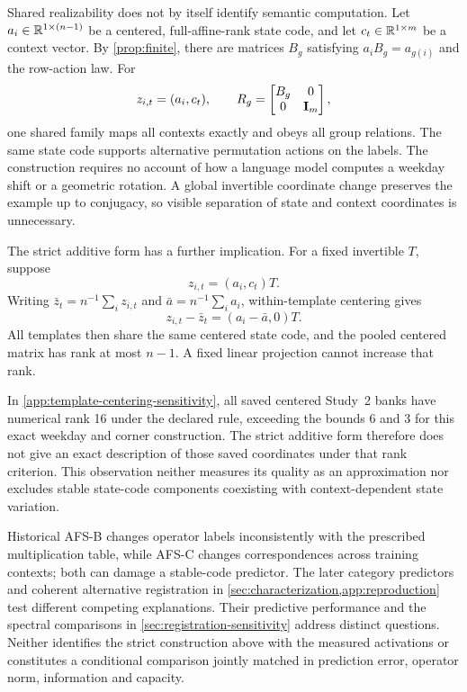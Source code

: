 Shared realizability does not by itself identify semantic
computation.
Let $a_i\in\mathbb{R}^{1\times(n-1)}$ be a centered,
full-affine-rank state code, and let
$c_t\in\mathbb{R}^{1\times m}$ be a context vector.
By \cref{prop:finite}, there are matrices $B_g$ satisfying
$a_iB_g=a_{g(i)}$ and the row-action law.
For
\[
 z_{i,t}=(a_i,c_t),
 \qquad
 R_g=
 \begin{bmatrix}
  B_g&0\\
  0&\mathbf{I}_m
 \end{bmatrix},
\]
one shared family maps all contexts exactly and obeys all
group relations.
The same state code supports alternative permutation
actions on the labels.
The construction requires no account of how a language
model computes a weekday shift or a geometric rotation.
A global invertible coordinate change preserves the
example up to conjugacy, so visible separation of state
and context coordinates is unnecessary.

The strict additive form has a further implication.
For a fixed invertible $T$, suppose
\[
 z_{i,t}=(a_i,c_t)T.
\]
Writing $\bar z_t=n^{-1}\sum_i z_{i,t}$ and
$\bar a=n^{-1}\sum_i a_i$, within-template centering gives
\[
 z_{i,t}-\bar z_t=(a_i-\bar a,0)T.
\]
All templates then share the same centered state code,
and the pooled centered matrix has rank at most $n-1$.
A fixed linear projection cannot increase that rank.

In \cref{app:template-centering-sensitivity}, all saved
centered Study~2 banks have numerical rank 16 under the
declared rule, exceeding the bounds 6 and 3 for this exact
weekday and corner construction.
The strict additive form therefore does not give an exact
description of those saved coordinates under that rank
criterion.
This observation neither measures its quality as an
approximation nor excludes stable state-code components
coexisting with context-dependent state variation.

Historical AFS-B changes operator labels inconsistently
with the prescribed multiplication table, while AFS-C
changes correspondences across training contexts;
both can damage a stable-code predictor.
The later category predictors and coherent alternative
registration in
\cref{sec:characterization,app:reproduction}
test different competing explanations.
Their predictive performance and the spectral comparisons
in \cref{sec:registration-sensitivity} address distinct
questions.
Neither identifies the strict construction above with
the measured activations or constitutes a conditional
comparison jointly matched in prediction error, operator
norm, information and capacity.


